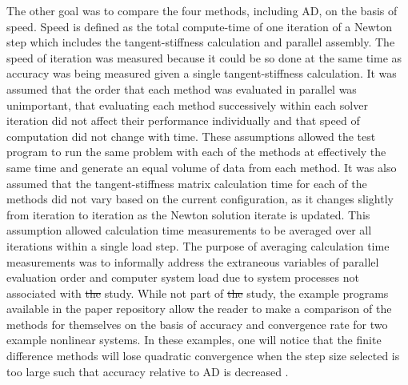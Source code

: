 \documentclass[preprint,12pt]{elsarticle}
\providecommand{\DIFaddtex}[1]{{\protect\color{blue}\uwave{#1}}} %
\providecommand{\DIFdeltex}[1]{{\protect\color{red}\sout{#1}}}                      %
\providecommand{\DIFaddbegin}{} %
\providecommand{\DIFaddend}{} %
\providecommand{\DIFdelbegin}{} %
\providecommand{\DIFdelend}{} %
\providecommand{\DIFadd}[1]{\texorpdfstring{\DIFaddtex{#1}}{#1}} %
\providecommand{\DIFdel}[1]{\texorpdfstring{\DIFdeltex{#1}}{}} %
\begin{document}
The other goal was to compare the four methods, including AD, on the basis of speed. Speed is defined as the total compute-time of one iteration of a Newton step which includes the tangent-stiffness \DIFaddbegin \DIFadd{matrix }\DIFaddend calculation and parallel assembly.  The speed of iteration was measured because it could be so done at the same time as accuracy was being measured given a single tangent-stiffness calculation.  It was assumed that the order that each method was evaluated in parallel was unimportant, that evaluating each method successively within each solver iteration did not affect their performance individually and that speed of computation did not change with time. These assumptions allowed the test program to run the same problem with each of the methods at effectively the same time and generate an equal volume of data from each method. It was also assumed that the tangent-stiffness matrix calculation time for each of the methods did not vary based on the current configuration, as it changes slightly from iteration to iteration as the Newton solution iterate is updated.  This assumption allowed calculation time measurements to be averaged over all iterations within a single load step. The purpose of averaging calculation time measurements was to informally address the extraneous variables of parallel evaluation order and computer system load due to system processes not associated with \DIFdelbegin \DIFdel{the }\DIFdelend \DIFaddbegin \DIFadd{this }\DIFaddend study. While not part of \DIFdelbegin \DIFdel{the }\DIFdelend \DIFaddbegin \DIFadd{this }\DIFaddend study, the example programs available in the paper repository allow the reader to make a comparison of the methods for themselves on the basis of accuracy and convergence rate for two example nonlinear systems. In these examples, one will notice that the finite difference methods will lose quadratic convergence when the step size selected is too large such that accuracy relative to AD is decreased \DIFaddbegin \DIFadd{as shown in Table~\ref{tab:ConvergenceStudy}}\DIFaddend .
\end{document}
